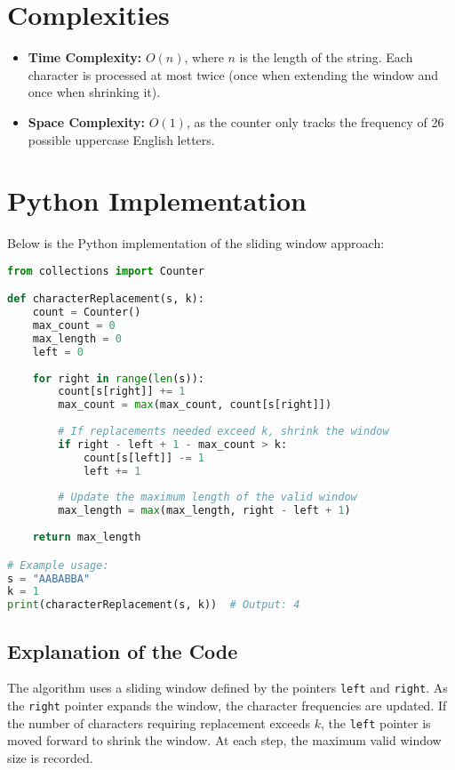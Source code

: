 \section*{Complexities}
\begin{itemize}
    \item \textbf{Time Complexity:} \(O(n)\), where \(n\) is the length of the string. Each character is processed at most twice (once when extending the window and once when shrinking it).
    \item \textbf{Space Complexity:} \(O(1)\), as the counter only tracks the frequency of 26 possible uppercase English letters.
\end{itemize}

\section*{Python Implementation}
Below is the Python implementation of the sliding window approach:

\begin{fullwidth}
\begin{lstlisting}[language=Python]
from collections import Counter

def characterReplacement(s, k):
    count = Counter()
    max_count = 0
    max_length = 0
    left = 0
    
    for right in range(len(s)):
        count[s[right]] += 1
        max_count = max(max_count, count[s[right]])
        
        # If replacements needed exceed k, shrink the window
        if right - left + 1 - max_count > k:
            count[s[left]] -= 1
            left += 1
        
        # Update the maximum length of the valid window
        max_length = max(max_length, right - left + 1)
    
    return max_length

# Example usage:
s = "AABABBA"
k = 1
print(characterReplacement(s, k))  # Output: 4
\end{lstlisting}
\end{fullwidth}

\subsection*{Explanation of the Code}
The algorithm uses a sliding window defined by the pointers \texttt{left} and \texttt{right}. As the \texttt{right} pointer expands the window, the character frequencies are updated. If the number of characters requiring replacement exceeds \( k \), the \texttt{left} pointer is moved forward to shrink the window. At each step, the maximum valid window size is recorded.

